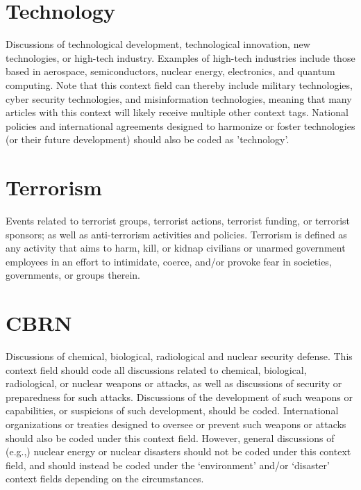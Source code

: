 \documentclass[11pt]{report}
\begin{document}
\section{Technology}\label{context:tech}
Discussions of technological development, technological innovation, new technologies, or high-tech industry. Examples of high-tech industries include those based in aerospace, semiconductors, nuclear energy, electronics, and quantum computing. Note that this context field can thereby include military technologies, cyber security technologies, and misinformation technologies, meaning that many articles with this context will likely receive multiple other context tags. National policies and international agreements designed to harmonize or foster technologies (or their future development) should also be coded as 'technology'.



\section{Terrorism}\label{context:terrorism}

Events related to terrorist groups, terrorist actions, terrorist funding, or terrorist sponsors; as well as anti-terrorism activities and policies. Terrorism is defined as any activity that aims to harm, kill, or kidnap civilians or unarmed government employees in an effort to intimidate, coerce, and/or provoke fear in societies, governments, or groups therein.

\section{CBRN}\label{context:cbrn}

Discussions of chemical, biological, radiological and nuclear security defense. This context field should code all discussions related to chemical, biological, radiological, or nuclear weapons or attacks, as well as discussions of security or preparedness for such attacks. Discussions of the development of such weapons or capabilities, or suspicions of such development, should be coded. International organizations or treaties designed to oversee or prevent such weapons or attacks should also be coded under this context field. However, general discussions of (e.g.,) nuclear energy or nuclear disasters should not be coded under this context field, and should instead be coded under the `environment' and/or `disaster' context fields depending on the circumstances.
\end{document}
